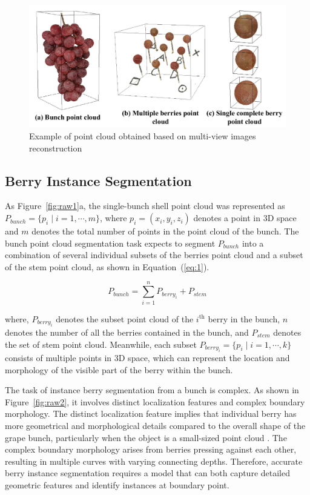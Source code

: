 \documentclass[12pt]{article}
\begin{document}
\begin{figure}[hbt!]
    \centering
    \includegraphics[width=1\textwidth]{figures/Figure4.pdf}
    \caption{Example of point cloud obtained based on multi-view images reconstruction}
    \label{fig:raw10}
\end{figure}

\subsection{Berry Instance Segmentation}
\label{sec:22}

As Figure~\ref{fig:raw1}a, the single-bunch shell point cloud was represented as $P_{bunch}=\{p_i \mid i=1, \cdots, m\}$, where $p_i=(x_i,y_i,z_i)$ denotes a point in 3D space and $m$ denotes the total number of points in the point cloud of the bunch. The bunch point cloud segmentation task expects to segment $P_{bunch}$ into a combination of several individual subsets of the berries point cloud and a subset of the stem point cloud, as shown in Equation~(\ref{eq:1}).

\begin{equation}
P_{bunch} = \sum_{i=1}^{n} P_{berry_{i}} + P_{stem}
\label{eq:1}
\end{equation}

{\raggedright where, $P_{berry_{i}}$ denotes the subset point cloud of the $i^{\text{th}}$ berry in the bunch, $n$ denotes the number of all the berries contained in the bunch, and $P_{stem}$ denotes the set of stem point cloud. 
Meanwhile, each subset $P_{berry_{i}}=\{p_i \mid i=1, \cdots, k\}$ consists of multiple points in 3D space, which can represent the location and morphology of the visible part of the berry within the bunch.}

The task of instance berry segmentation from a bunch is complex. 
As shown in Figure~\ref{fig:raw2}, it involves distinct localization features and complex boundary morphology. 
The distinct localization feature implies that individual berry has more geometrical and morphological details compared to the overall shape of the grape bunch, particularly when the object is a small-sized point cloud \citep{luo_infield_2022}. 
The complex boundary morphology arises from berries pressing against each other, resulting in multiple curves with varying connecting depths. 
Therefore, accurate berry instance segmentation requires a model that can both capture detailed geometric features and identify instances at boundary point. 
\end{document}
